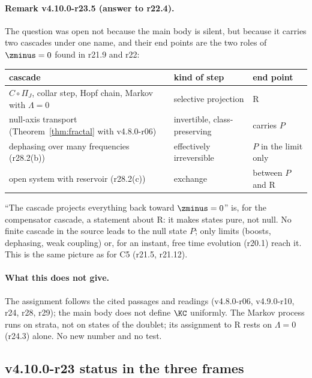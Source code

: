 \paragraph{Remark v4.10.0-r23.5 (answer to r22.4).}
The question was open not because the main body is silent, but because it carries two cascades under one name, and their end points
are the two roles of \(\zminus=0\) found in r21.9 and r22:
\begin{center}
\small
\begin{tabular}{@{}>{\raggedright\arraybackslash}p{}>{\raggedright\arraybackslash}p{}>{\raggedright\arraybackslash}p{}@{}}
\toprule
cascade & kind of step & end point\\
\midrule
\(C\circ\Pi_J\), collar step, Hopf chain, Markov with \(\Lambda=0\) & selective projection & R\\
null-axis transport (Theorem~\ref{thm:fractal} with v4.8.0-r06) & invertible, class-preserving & carries \(P\)\\
dephasing over many frequencies (r28.2(b)) & effectively irreversible & \(P\) in the limit only\\
open system with reservoir (r28.2(c)) & exchange & between \(P\) and R\\
\bottomrule
\end{tabular}
\end{center}
``The cascade projects everything back toward \(\zminus=0\)'' is, for the compensator cascade, a statement about R: it makes states
pure, not null.  No finite cascade in the source leads to the null state \(P\); only limits (boosts, dephasing, weak coupling) or, for an
instant, free time evolution (r20.1) reach it.  This is the same picture as for C5 (r21.5, r21.12).

\paragraph{What this does not give.}
The assignment follows the cited passages and readings (v4.8.0-r06, v4.9.0-r10, r24, r28, r29); the main body does not define \(\KC\)
uniformly.  The Markov process runs on strata, not on states of the doublet; its assignment to R rests on \(\Lambda=0\) (r24.3) alone.  No
new number and no test.

\subsection*{v4.10.0-r23 status in the three frames}
\label{subsec:v4100-r23-frames}

